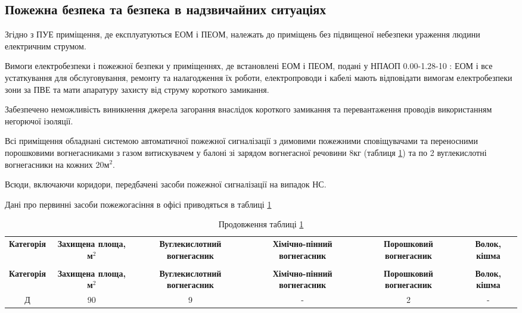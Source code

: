 \subsection{Пожежна безпека та безпека в надзвичайних ситуаціях}
\par Згідно з ПУЕ приміщення, де експлуатуються ЕОМ і ПЕОМ, належать до приміщень без підвищеної небезпеки ураження людини електричним струмом.
\par Вимоги електробезпеки і пожежної безпеки у приміщеннях, де встановлені ЕОМ і ПЕОМ, подані у НПАОП 0.00-1.28-10 \cite{safety_gost_npaop}: ЕОМ і все устаткування для обслуговування, ремонту та налагодження їх роботи, електропроводи і кабелі мають відповідати вимогам електробезпеки зони за ПВЕ та мати апаратуру захисту від струму короткого замикання.

\par Забезпечено неможливість виникнення джерела загорання внаслідок короткого замикання та перевантаження проводів використанням негорючої ізоляції.

\par Всі приміщення обладнані системою автоматичної пожежної сигналізації з димовими пожежними сповіщувачами та переносними порошковими вогнегасниками з газом витискувачем у балоні зі зарядом вогнегасної речовини 8кг\cite{safety_vogon_nakaz} (таблиця \ref{t:safety_vogon}) та по 2 вуглекислотні вогнегасники на кожних 20м$^2$.

\par Всюди, включаючи коридори, передбачені засоби пожежної сигналізації на випадок НС.

\par Дані про первинні засоби пожежогасіння в офісі приводяться в таблиці \ref{t:safety_vogon}

{\footnotesize
\begin{longtable}{|c|c|c|c|c|c|}
\captionsetup{justification=centering}
\caption{первинні засоби пожежогасіння}\label{t:safety_vogon}\\
\hline
\multicolumn{1}{|c|}{\textbf{Категорія}}&
\multicolumn{1}{p{2cm}|}{\textbf{Захищена площа, м$^2$}}&
\multicolumn{1}{p{3cm}|}{\textbf{Вуглекислотний вогнегасник}}&
\multicolumn{1}{p{2cm}|}{\textbf{Хімічно-пінний вогнегасник}}&
\multicolumn{1}{p{3cm}|}{\textbf{Порошковий вогнегасник}}&
\multicolumn{1}{p{3cm}|}{\textbf{Волок, кішма }}\\ \hline

\endfirsthead
\caption*{\hfill Продовження таблиці \ref{t:safety_vogon}}\\ \hline

\multicolumn{1}{|c|}{\textbf{Категорія}}&
\multicolumn{1}{p{2cm}|}{\textbf{Захищена площа, м$^2$}}&
\multicolumn{1}{p{3cm}|}{\textbf{Вуглекислотний вогнегасник}}&
\multicolumn{1}{p{2cm}|}{\textbf{Хімічно-пінний вогнегасник}}&
\multicolumn{1}{p{3cm}|}{\textbf{Порошковий вогнегасник}}&
\multicolumn{1}{p{3cm}|}{\textbf{Волок, кішма }}\\ \hline
\endhead

Д & 90 & 9 & - & 2 & - \\ \hline
\end{longtable}
}

